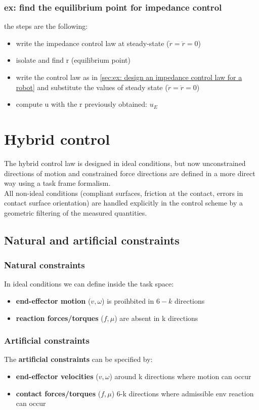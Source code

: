 \documentclass[a4paper,12pt]{article}
\begin{document}
\subsubsection{ex: find the equilibrium point for impedance control}
the steps are the following:
\begin{itemize}
\item write the impedance control law at steady-state ($\dot{r}=\ddot{r}=0$)
\item isolate and find r (equilibrium point)
\item write the control law as in \ref{sec:ex: design an impedance control law for a robot}
and substitute the values of steady state ($\dot{r}=\ddot{r}=0$)
\item compute u with the r previously obtained: $u_E$
\end{itemize}











\section{Hybrid control}
The hybrid control law is designed in ideal conditions, but now
unconstrained directions of motion and constrained force directions
are defined in a more direct way using a task frame formalism.\\
All non-ideal conditions (compliant surfaces, friction at the contact,
errors in contact surface orientation) are handled explicitly in the
control scheme by a geometric filtering of the measured quantities.
\subsection{Natural and artificial constraints}
\subsubsection{Natural constraints}
In ideal conditions we can define inside the task space:
\begin{itemize}
\item \textbf{end-effector motion} ($v,\omega$) is proihbited 
in $6-k$ directions
\item \textbf{reaction forces/torques} ($f,\mu$) are absent 
in k directions
\end{itemize}
\subsubsection{Artificial constraints}
The \textbf{artificial constraints} can be specified by:
\begin{itemize}
    \item \textbf{end-effector velocities} ($v,\omega$) 
    around k directions where motion can occur 
    \item \textbf{contact forces/torques} ($f,\mu$)
    6-k directions where admissible env reaction can occur
\end{itemize}
\end{document}
